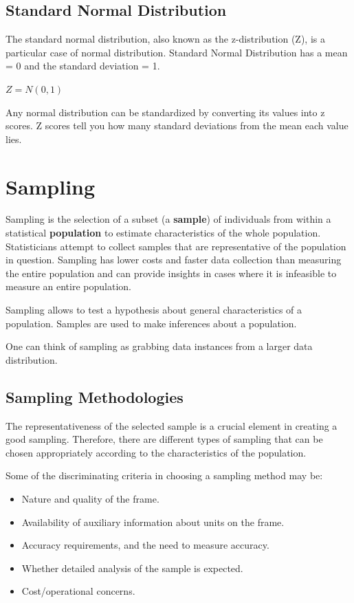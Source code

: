 \documentclass{article}
\begin{document}
\subsection{Standard Normal Distribution}
The standard normal distribution, also known as the z-distribution (Z), is a particular case of normal distribution. Standard Normal Distribution has a mean = 0 and the standard deviation = 1.

$Z = N(0,1)$

Any normal distribution can be standardized by converting its values into z scores. Z scores tell you how many standard deviations from the mean each value lies.

\clearpage

\section{Sampling}
Sampling is the selection of a subset (a \textbf{sample}) of individuals from within a statistical \textbf{population} to estimate characteristics of the whole population. Statisticians attempt to collect samples that are representative of the population in question. Sampling has lower costs and faster data collection than measuring the entire population and can provide insights in cases where it is infeasible to measure an entire population.

Sampling allows to test a hypothesis about general characteristics of a population.
Samples are used to make inferences about a population. 

One can think of sampling as grabbing data instances from a larger data distribution. 

\subsection{Sampling Methodologies}
The representativeness of the selected sample is a crucial element in creating a good sampling. Therefore, there are different types of sampling that can be chosen appropriately according to the characteristics of the population.

Some of the discriminating criteria in choosing a sampling method may be:
\begin{itemize}
    \item Nature and quality of the frame.
    \item Availability of auxiliary information about units on the frame.
    \item Accuracy requirements, and the need to measure accuracy.
    \item Whether detailed analysis of the sample is expected.
    \item Cost/operational concerns.
\end{itemize}
\end{document}
